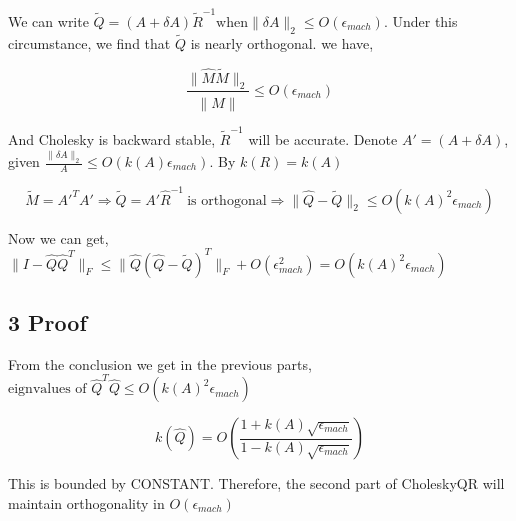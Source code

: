 \documentclass{article}
\def\implies{\Longrightarrow}
\begin{document}
We can write $\tilde Q = (A + \delta A)\tilde R^{-1} \text{when} \| \delta A\|_2 \le O(\epsilon_{mach})$. Under this circumstance, we find that $\tilde Q$ is nearly orthogonal. we have,

$$\frac{\|\hat M \tilde M \|_2}{\|\hat M \|} \le O(\epsilon_{mach})$$

And Cholesky is backward stable, $\tilde R^{-1}$ will be accurate. Denote $A' = (A + \delta A)$, given $\frac{\|\delta A \|_2}{A} \le O(k(A)\epsilon_{mach})$. By $k(R) = k(A)$

$$\tilde M = A'^T A' \implies \tilde Q = A'\hat R^{-1} \ \text{is orthogonal} \implies \|\hat Q - \tilde Q \|_2 \le O(k(A)^2\epsilon_{mach})$$

Now we can get, $\|I -\hat Q \hat Q^T \|_F \le \|\hat Q(\hat Q -\tilde Q )^T \|_F + O(\epsilon_{mach}^2) = O(k(A)^2\epsilon_{mach})$


\subsection*{3 Proof}

From the conclusion we get in the previous parts, $ \text{eignvalues of }\hat Q^T \hat Q \le O(k(A)^2\epsilon_{mach})$ 

$$k(\hat Q) = O(\frac{1 + k(A) \sqrt{\epsilon_{mach}}}{1 - k(A) \sqrt{\epsilon_{mach}}})$$

This is bounded by CONSTANT. Therefore, the second part of CholeskyQR will maintain orthogonality in $O(\epsilon_{mach})$
\end{document}
